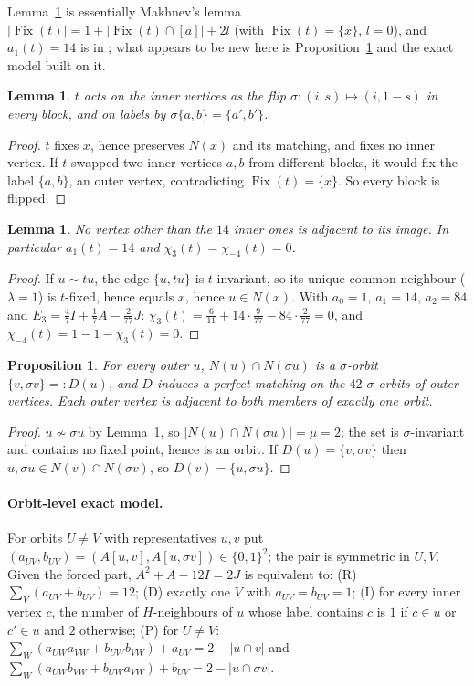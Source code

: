 \documentclass[11pt,a4paper]{article}
\newtheorem{proposition}[theorem]{Proposition}
\newtheorem{lemma}[theorem]{Lemma}
\theoremstyle{remark}
\newcommand{\Fix}{\operatorname{Fix}}
\begin{document}
Lemma~\ref{lem:flip} is essentially Makhnev's lemma $|\Fix(t)|=1+|\Fix(t)\cap[a]|+2l$ \cite{Mak} (with $\Fix(t)=\{x\}$, $l=0$), and $a_1(t)=14$ is in \cite{MM04};
what appears to be new here is Proposition~\ref{prop:matching} and the exact model built on it.
\begin{lemma}\label{lem:flip}
$t$ acts on the inner vertices as the flip $\sigma:(i,s)\mapsto(i,1-s)$ in every block, and on labels by $\sigma\{a,b\}=\{a',b'\}$.
\end{lemma}
\begin{proof}
$t$ fixes $x$, hence preserves $N(x)$ and its matching, and fixes no inner vertex. If $t$ swapped two inner vertices $a,b$ from different blocks,
it would fix the label $\{a,b\}$, an outer vertex, contradicting $\Fix(t)=\{x\}$. So every block is flipped.
\end{proof}

\begin{lemma}\label{lem:noself}
No vertex other than the $14$ inner ones is adjacent to its image. In particular $a_1(t)=14$ and $\chi_3(t)=\chi_{-4}(t)=0$.
\end{lemma}
\begin{proof}
If $u\sim tu$, the edge $\{u,tu\}$ is $t$-invariant, so its unique common neighbour ($\lambda=1$) is $t$-fixed, hence equals $x$, hence $u\in N(x)$.
With $a_0=1$, $a_1=14$, $a_2=84$ and $E_3=\tfrac47I+\tfrac17A-\tfrac2{77}J$: $\chi_3(t)=\tfrac{6}{11}+14\cdot\tfrac{9}{77}-84\cdot\tfrac{2}{77}=0$, and $\chi_{-4}(t)=1-1-\chi_3(t)=0$.
\end{proof}

\begin{proposition}\label{prop:matching}
For every outer $u$, $N(u)\cap N(\sigma u)$ is a $\sigma$-orbit $\{v,\sigma v\}=:D(u)$, and $D$ induces a perfect matching on the $42$ $\sigma$-orbits of outer vertices.
Each outer vertex is adjacent to both members of exactly one orbit.
\end{proposition}
\begin{proof}
$u\not\sim\sigma u$ by Lemma~\ref{lem:noself}, so $|N(u)\cap N(\sigma u)|=\mu=2$; the set is $\sigma$-invariant and contains no fixed point, hence is an orbit.
If $D(u)=\{v,\sigma v\}$ then $u,\sigma u\in N(v)\cap N(\sigma v)$, so $D(v)=\{u,\sigma u\}$.
\end{proof}

\paragraph{Orbit-level exact model.} For orbits $U\neq V$ with representatives $u,v$ put $(a_{UV},b_{UV})=(A[u,v],A[u,\sigma v])\in\{0,1\}^2$;
the pair is symmetric in $U,V$. Given the forced part, $A^2+A-12I=2J$ is equivalent to:
(R) $\sum_{V}(a_{UV}+b_{UV})=12$; (D) exactly one $V$ with $a_{UV}=b_{UV}=1$; (I) for every inner vertex $c$, the number of $H$-neighbours of $u$ whose label contains $c$ is $1$ if $c\in u$ or $c'\in u$ and $2$ otherwise;
(P) for $U\neq V$: $\sum_W(a_{UW}a_{VW}+b_{UW}b_{VW})+a_{UV}=2-|u\cap v|$ and $\sum_W(a_{UW}b_{VW}+b_{UW}a_{VW})+b_{UV}=2-|u\cap\sigma v|$.
\end{document}
